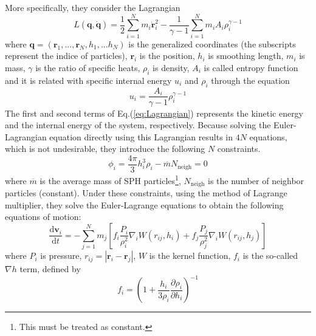 More specifically, they consider the Lagrangian
\begin{equation}
L(\bm{q}, \dot{\bm{q}}) = \dfrac{1}{2}\sum^{N}_{i=1}m_{i}\dot{\bm{r}}^{2}_{i} - \dfrac{1}{\gamma -1}\sum^{N}_{i=1}m_{i}A_{i}\rho^{\gamma-1}_{i} \label{eq:Lagrangian}
\end{equation}
where $\bm{q}=(\bm{r}_{1},...,\bm{r}_{N},h_{1},...h_{N})$ is the generalized coordinates (the subscripts represent the indice of particles), $\bm{r}_{i}$ is the position, $h_{i}$ is smoothing length, $m_{i}$ is mass, $\gamma$ is the ratio of specific heats, $\rho_{i}$ is density, $A_{i}$ is called entropy function and it is related with specific internal energy $u_{i}$ and $\rho_{i}$ through the equation
\begin{equation}
u_{i} = \dfrac{A_{i}}{\gamma-1}\rho^{\gamma-1}_{i} \label{eq:relation_between_u_A_rho}
\end{equation}
The first and second terms of Eq.(\ref{eq:Lagrangian}) represents the kinetic energy and the internal energy of the system, respectively. Because solving the Euler-Lagrangian equation directly using this Lagrangian results in $4N$ equations, which is not undesirable, they introduce the following $N$ constraints.
\begin{equation}
\phi_{i} = \dfrac{4\pi}{3}h^{3}_{i}\rho_{i} - \overline{m}N_{\mathrm{neigh}}=0 \label{eq:Springel_SPH_constraints}
\end{equation}
where $\overline{m}$ is the average mass of SPH particles\footnote{This must be treated as constant.}, $N_{\mathrm{neigh}}$ is the number of neighbor particles (constant). Under these constraints, using the method of Lagrange multiplier, they solve the Euler-Lagrange equations to obtain the following equations of motion:
\begin{equation}
\dfrac{\mathrm{d}\bm{v}_{i}}{\mathrm{d}t} = - \sum^{N}_{j=1}m_{j}\left[f_{i}\dfrac{P_{i}}{\rho^{2}_{i}}\nabla_{i}W(r_{ij},h_{i})+f_{j}\dfrac{P_{j}}{\rho^{2}_{j}}\nabla_{i}W(r_{ij},h_{j})\right] \label{eq:Springel_SPH_EoM_pure_hydro}
\end{equation}
where $P_{i}$ is pressure, $r_{ij}=|\bm{r}_{i}-\bm{r}_{j}|$, $W$ is the kernel function, $f_{i}$ is the so-called $\nabla h$ term, defined by
\begin{equation}
f_{i} = \left(1 + \dfrac{h_{i}}{3\rho_{i}}\dfrac{\partial \rho_{i}}{\partial h_{i}}\right)^{-1} \label{eq:gradh_term}
\end{equation}

